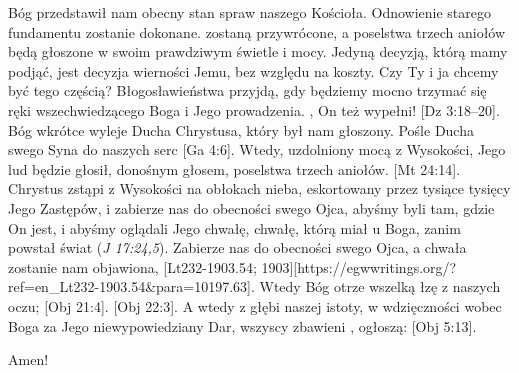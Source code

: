 Bóg przedstawił nam obecny stan spraw naszego Kościoła. Odnowienie starego fundamentu zostanie dokonane.  zostaną przywrócone, a poselstwa trzech aniołów będą głoszone w swoim prawdziwym świetle i mocy. Jedyną decyzją, którą mamy podjąć, jest decyzja wierności Jemu, bez względu na koszty. Czy Ty i ja chcemy być tego częścią? Błogosławieństwa przyjdą, gdy będziemy mocno trzymać się ręki wszechwiedzącego Boga i Jego prowadzenia. , On też wypełni! [Dz 3:18--20]. Bóg wkrótce wyleje Ducha Chrystusa, który był nam głoszony. Pośle Ducha swego Syna do naszych serc [Ga 4:6]. Wtedy, uzdolniony mocą z Wysokości, Jego lud będzie głosił, donośnym głosem, poselstwa trzech aniołów. [Mt 24:14]. Chrystus zstąpi z Wysokości na obłokach nieba, eskortowany przez tysiące tysięcy Jego Zastępów, i zabierze nas do obecności swego Ojca, abyśmy byli tam, gdzie On jest, i abyśmy oglądali Jego chwałę, chwałę, którą miał u Boga, zanim powstał świat (\textit{J 17:24,5}). Zabierze nas do obecności swego Ojca, a chwała zostanie nam objawiona, [Lt232-1903.54; 1903][https://egwwritings.org/?ref=en\_Lt232-1903.54&para=10197.63]. Wtedy Bóg otrze wszelką łzę z naszych oczu; [Obj 21:4]. [Obj 22:3]. A wtedy z głębi naszej istoty, w wdzięczności wobec Boga za Jego niewypowiedziany Dar, wszyscy zbawieni , ogłoszą: [Obj 5:13].

Amen!

%

% 